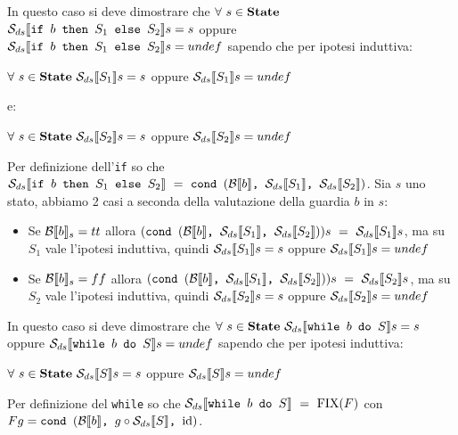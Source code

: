 {     In questo caso si deve dimostrare che 
    $\forall~s\in\states$\\$\dsCtxt{\ifABC{b}{S_1}{S_2}}s=s$ oppure 
    $\dsCtxt{\ifABC{b}{S_1}{S_2}}s=undef$ sapendo che per ipotesi induttiva:
    \begin{center}
    $\forall~s\in\states~\dsCtxt{S_1}s=s$ oppure $\dsCtxt{S_1}s=undef$
    \end{center}
    e:
    \begin{center}
    $\forall~s\in\states~\dsCtxt{S_2}s=s$ oppure $\dsCtxt{S_2}s=undef$
    \end{center}
    Per definizione dell'\texttt{if} so che 
    $\dsCtxt{\ifABC{b}{S_1}{S_2}}~=~\cond{b}{\dsCtxt{S_1}}{\dsCtxt{S_2}}$. Sia
    $s$ uno stato, abbiamo 2 casi a seconda della valutazione della guardia $b$
    in $s$:
    \begin{itemize}
    \item Se $\evalBbs{b}{s}=tt$ allora $(\cond{b}{\dsCtxt{S_1}}{\dsCtxt{S_2}})s
    ~=~\dsCtxt{S_1}s$, ma su $S_1$ vale l'ipotesi induttiva, quindi 
    $\dsCtxt{S_1}s=s$ oppure $\dsCtxt{S_1}s=undef$
    
    \item Se $\evalBbs{b}{s}=ff$ allora $(\cond{b}{\dsCtxt{S_1}}{\dsCtxt{S_2}})s
    ~=~\dsCtxt{S_2}s$, ma su $S_2$ vale l'ipotesi induttiva, quindi 
    $\dsCtxt{S_2}s=s$ oppure $\dsCtxt{S_2}s=undef$
    \end{itemize}

     In questo caso si deve dimostrare che 
    $\forall~s\in\states~\dsCtxt{\wbS{b}{S}}s=s$ oppure 
    $\dsCtxt{\wbS{b}{S}}s=undef$ sapendo che per ipotesi induttiva:
    \begin{center}
    $\forall~s\in\states~\dsCtxt{S}s=s$ oppure $\dsCtxt{S}s=undef$
    \end{center}
    Per definizione del \texttt{while} so che 
    $\dsCtxt{\wbS{b}{S}}~=~\fixp{F}$ con $F g = \cond{b}{g \circ \Sds}{\idDS}$.
    
}
